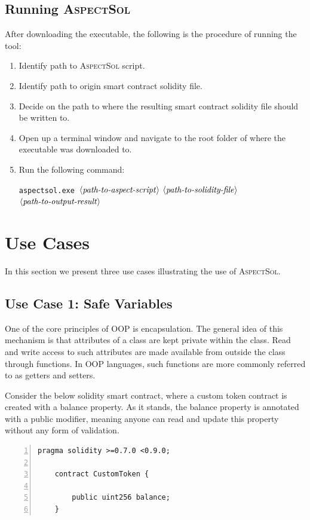 \documentclass{article}
\newcommand{\AspectSol}{\textsc{AspectSol}\xspace}
\newcommand{\variable}[1]{\ensuremath{\langle\textrm{\textit{#1}}\rangle}}
\begin{document}
\subsection{Running \AspectSol}

After downloading the executable, the following is the procedure of running the tool:

\begin{enumerate}
    \item Identify path to \AspectSol script.
    \item Identify path to origin smart contract solidity file.
    \item Decide on the path to where the resulting smart contract solidity file should be written to.
    \item Open up a terminal window and navigate to the root folder of where the executable was downloaded to.
    \item Run the following command:
    
    \centerline{
        \texttt{aspectsol.exe \variable{path-to-aspect-script}} \variable{path-to-solidity-file} \variable{path-to-output-result}
    }
\end{enumerate}


\section{Use Cases}

In this section we present three use cases illustrating the use of \AspectSol.

\subsection{Use Case 1: Safe Variables}

One of the core principles of OOP is encapsulation. The general idea of this mechanism is that attributes of a class are kept private within the class. Read and write access to such attributes are made available from outside the class through functions. In OOP languages, such functions are more commonly referred to as getters and setters.

Consider the below solidity smart contract, where a custom token contract is created with a balance property. As it stands, the balance property is annotated with a public modifier, meaning anyone can read and update this property without any form of validation.

\small\begin{lstlisting}[language=Solidity,numbers=left,numbersep=2pt,xleftmargin=0.3cm,label={code:nonSafeVariableExample}, caption={Unsafe Variable Smart Contract.}]
	pragma solidity >=0.7.0 <0.9.0;
	
	contract CustomToken {
		
		public uint256 balance;
	}
\end{lstlisting}\normalsize
	
\end{document}
